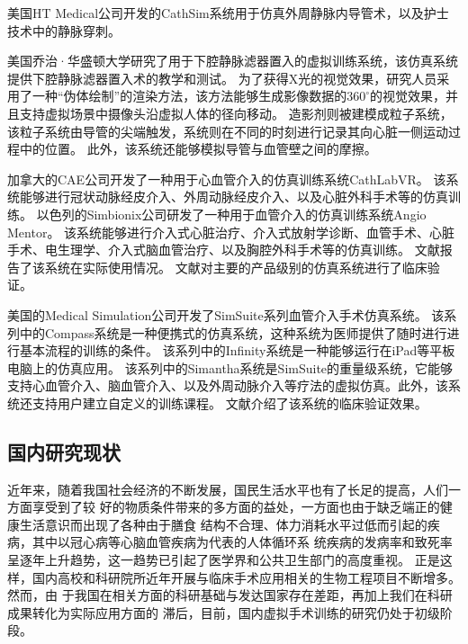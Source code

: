 美国HT Medical公司开发的CathSim系统用于仿真外周静脉内导管术\cite{ursino1999cathsim}，以及护士技术中的静脉穿刺\cite{Barker1999CathSim}。

美国乔治·华盛顿大学研究了用于下腔静脉滤器置入的虚拟训练系统\cite{Hahn1998GWU}，该仿真系统提供下腔静脉滤器置入术的教学和测试。
为了获得X光的视觉效果，研究人员采用了一种“伪体绘制”的渲染方法\cite{Park1996GWU}，该方法能够生成影像数据的$360^\circ$的视觉效果，并且支持虚拟场景中摄像头沿虚拟人体的径向移动。
造影剂则被建模成粒子系统，该粒子系统由导管的尖端触发，系统则在不同的时刻进行记录其向心脏一侧运动过程中的位置\cite{Hahn1998GWU}。
此外，该系统还能够模拟导管与血管壁之间的摩擦\cite{Hahn1998GWU}。

加拿大的CAE公司\cite{caeweb}开发了一种用于心血管介入的仿真训练系统CathLabVR。
该系统能够进行冠状动脉经皮介入、外周动脉经皮介入、以及心脏外科手术等的仿真训练。
以色列的Simbionix公司\cite{simbionixweb}研发了一种用于血管介入的仿真训练系统Angio Mentor。
该系统能够进行介入式心脏治疗、介入式放射学诊断、血管手术、心脏手术、电生理学、介入式脑血管治疗、以及胸腔外科手术等的仿真训练。
文献\cite{hislop2009Simbionix}\cite{Lee2012Simbionix}报告了该系统在实际使用情况。
文献\cite{Petri2013Comparison}对主要的产品级别的仿真系统进行了临床验证。

美国的Medical Simulation公司开发了SimSuite\cite{simsuiteweb}系列血管介入手术仿真系统。
该系列中的Compass系统是一种便携式的仿真系统，这种系统为医师提供了随时进行进行基本流程的训练的条件。
该系列中的Infinity系统是一种能够运行在iPad等平板电脑上的仿真应用。
该系列中的Simantha系统是SimSuite的重量级系统，它能够支持心血管介入、脑血管介入、以及外周动脉介入等疗法的虚拟仿真。此外，该系统还支持用户建立自定义的训练课程。
文献\cite{Dawson2007SimSuite}介绍了该系统的临床验证效果。

\subsection{国内研究现状}
\label{sec1-4-2}

近年来，随着我国社会经济的不断发展，国民生活水平也有了长足的提高，人们一方面享受到了较
好的物质条件带来的多方面的益处，一方面也由于缺乏端正的健康生活意识而出现了各种由于膳食
结构不合理、体力消耗水平过低而引起的疾病，其中以冠心病等心脑血管疾病为代表的人体循环系
统疾病的发病率和致死率呈逐年上升趋势，这一趋势已引起了医学界和公共卫生部门的高度重视。
正是这样，国内高校和科研院所近年开展与临床手术应用相关的生物工程项目不断增多。然而，由
于我国在相关方面的科研基础与发达国家存在差距，再加上我们在科研成果转化为实际应用方面的
滞后，目前，国内虚拟手术训练的研究仍处于初级阶段。

